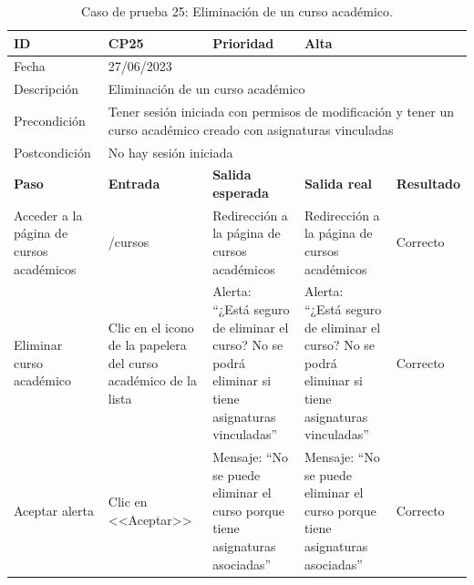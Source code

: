\begin{table}[H]
\begin{tabular}{p{} p{} p{} p{} p{}}
\cellcolor{gray!25}
ID   & CP25 & \cellcolor{gray!25} Prioridad   & Alta \\ \hline
\cellcolor{gray!25} Fecha	&	\multicolumn{4}{l}{27/06/2023} \\ \hline
\cellcolor{gray!25} Descripción		&	\multicolumn{4}{l}{Eliminación de un curso académico} \\ \hline                                            
\cellcolor{gray!25}
Precondición  & \multicolumn{4}{p{.66\textwidth}}{Tener sesión iniciada con permisos de modificación y tener un curso académico creado con asignaturas vinculadas} \\ \hline
\cellcolor{gray!25} Postcondición & \multicolumn{4}{l}{No hay sesión iniciada}                                                    \\ \hline
\rowcolor{gray!25}
\textbf{Paso}   & \textbf{Entrada} & \textbf{Salida esperada} & \textbf{Salida real} & \textbf{Resultado} \\ \hline
Acceder a la página de cursos académicos
& /cursos                                                                          
& Redirección a la página de cursos académicos                                  
& Redirección a la página de cursos académicos                                   
& Correcto                            
\\ \hline
Eliminar curso académico
& Clic en el icono de la papelera del curso académico de la lista
& Alerta: ``¿Está seguro de eliminar el curso? No se podrá eliminar si tiene asignaturas vinculadas''
& Alerta: ``¿Está seguro de eliminar el curso? No se podrá eliminar si tiene asignaturas vinculadas''
& Correcto
\\ \hline
Aceptar alerta
& Clic en <<Aceptar>>
& Mensaje: ``No se puede eliminar el curso porque tiene asignaturas asociadas''
& Mensaje: ``No se puede eliminar el curso porque tiene asignaturas asociadas''
& Correcto
\\ \hline          
\end{tabular}
\caption{Caso de prueba 25: Eliminación de un curso académico.}
\end{table}

